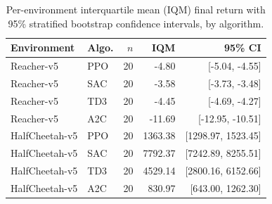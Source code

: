 \begin{table}[t]
\centering
\caption{Per-environment interquartile mean (IQM) final return with 95\% stratified bootstrap confidence intervals, by algorithm.}
\label{tab:iqm_summary}
\begin{tabular}{llrrr}
\toprule
Environment & Algo. & $n$ & IQM & 95\% CI \\
\midrule
Reacher-v5 & PPO & 20 & -4.80 & [-5.04, -4.55] \\
Reacher-v5 & SAC & 20 & -3.58 & [-3.73, -3.48] \\
Reacher-v5 & TD3 & 20 & -4.45 & [-4.69, -4.27] \\
Reacher-v5 & A2C & 20 & -11.69 & [-12.95, -10.51] \\
HalfCheetah-v5 & PPO & 20 & 1363.38 & [1298.97, 1523.45] \\
HalfCheetah-v5 & SAC & 20 & 7792.37 & [7242.89, 8255.51] \\
HalfCheetah-v5 & TD3 & 20 & 4529.14 & [2800.16, 6152.66] \\
HalfCheetah-v5 & A2C & 20 & 830.97 & [643.00, 1262.30] \\
\bottomrule
\end{tabular}
\end{table}